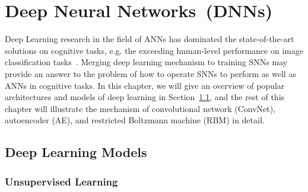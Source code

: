 \chapter{Deep Neural Networks~(DNNs)}
\label{cha:dnn}
Deep Learning research in the field of ANNs has dominated the state-of-the-art solutions on cognitive tasks, e.g. the exceeding human-level performance on image classification tasks~\cite{he2015delving}.
Merging deep learning mechanism to training SNNs may provide an answer to the problem of how to operate SNNs to perform as well as ANNs in cognitive tasks. 
In this chapter, we will give an overview of popular architectures and models of deep learning in Section~\ref{sec:dl_history}, and the rest of this chapter will illustrate the mechanism of convolutional network (ConvNet), autoencoder (AE), and restricted Boltzmann machine (RBM) in detail.

\section{Deep Learning Models}
\label{sec:dl_history}

\subsection{Unsupervised Learning}
%

